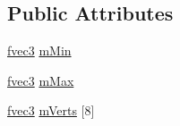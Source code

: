 \subsection*{Public Attributes}
\begin{DoxyCompactItemize}
\item 
\hyperlink{nsmath_8h_acc70582cd75ef520905deb63211e4b52}{fvec3} \hyperlink{structNSBoundingBox_ad23e224abed3b35fe44447404eff6021}{m\-Min}
\item 
\hyperlink{nsmath_8h_acc70582cd75ef520905deb63211e4b52}{fvec3} \hyperlink{structNSBoundingBox_a88e4cabc207b0d661f9b86070914b62e}{m\-Max}
\item 
\hyperlink{nsmath_8h_acc70582cd75ef520905deb63211e4b52}{fvec3} \hyperlink{structNSBoundingBox_a997316efc636f9f346c1ecbc1bf9288a}{m\-Verts} \mbox{[}8\mbox{]}
\end{DoxyCompactItemize}


